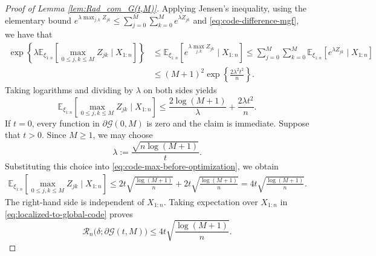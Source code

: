 \documentclass[11pt]{article}
\begin{document}
\begin{proof}[Proof of Lemma \ref{lem:Rad_com_G(t,M)}]
Applying Jensen's inequality, using the elementary bound $e^{\lambda\max_{j,k}Z_{jk}}
\leq
\sum_{j=0}^M\sum_{k=0}^M e^{\lambda Z_{jk}}$
and \eqref{eq:code-difference-mgf}, we have that
\begin{align*}
\exp\left\{
\lambda
\mathbb E_{\xi_{1:n}}
\left[
\max_{0\leq j,k\leq M}Z_{jk}
\mid X_{1:n}
\right]
\right\}
&\leq
\mathbb E_{\xi_{1:n}}
\left[
e^{\lambda\max_{j,k}Z_{jk}}
\mid X_{1:n}
\right]
\leq
\sum_{j=0}^M\sum_{k=0}^M
\mathbb E_{\xi_{1:n}}
\left[
e^{\lambda Z_{jk}}
\mid X_{1:n}
\right]\\
&\leq
(M+1)^2
\exp\left\{
\frac{2\lambda^2t^2}{n}
\right\}.
\end{align*}
Taking logarithms and dividing by \(\lambda\) on both sides yields
\begin{equation}
\mathbb E_{\xi_{1:n}}
\left[
\max_{0\leq j,k\leq M}Z_{jk}
\mid X_{1:n}
\right]
\leq
\frac{2\log(M+1)}{\lambda}
+
\frac{2\lambda t^2}{n}.
\label{eq:code-max-before-optimization}
\end{equation}
If \(t=0\), every function in \(\partial\mathcal G(0,M)\) is zero and the
claim is immediate.  Suppose that \(t>0\).  Since \(M\geq1\), we may choose
\[
\lambda
:=
\frac{\sqrt{n\log(M+1)}}{t}.
\]
Substituting this choice into \eqref{eq:code-max-before-optimization}, we obtain
\begin{align*}
\mathbb E_{\xi_{1:n}}
\left[
\max_{0\leq j,k\leq M}Z_{jk}
\mid X_{1:n}
\right]
\leq
2t\sqrt{\frac{\log(M+1)}{n}}
+
2t\sqrt{\frac{\log(M+1)}{n}}
=
4t\sqrt{\frac{\log(M+1)}{n}}.
\end{align*}
The right-hand side is independent of \(X_{1:n}\).  Taking expectation over
\(X_{1:n}\) in \eqref{eq:localized-to-global-code} proves
\[
\mathcal R_n\bigl(\delta;\partial\mathcal G(t,M)\bigr)
\leq
4t\sqrt{\frac{\log(M+1)}{n}}.
\]
\end{proof}
\end{document}
